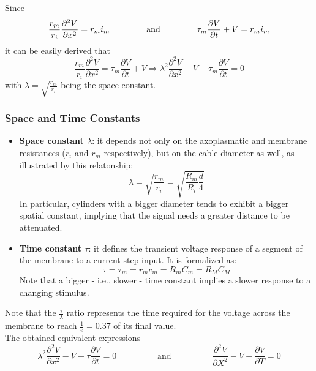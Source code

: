 Since
\begin{equation*}
    \frac{r_{m}}{r_{i}}\frac{\partial^{2}V}{\partial{x^{2}}}=r_{m}i_{m}
    \hspace{1.5cm}
    \text{and}
    \hspace{1.5cm}
    \tau_{m}\frac{\partial{V}}{\partial{t}}+V=r_{m}i_{m}
\end{equation*}
it can be easily derived that
\begin{equation*}
    \frac{r_{m}}{r_{i}}\frac{\partial^{2}V}{\partial{x^{2}}}
    =
    \tau_{m}\frac{\partial{V}}{\partial{t}}+V
    \Rightarrow
    \lambda^{2}\frac{\partial^{2}V}{\partial{x^{2}}}-V-\tau_{m}\frac{\partial{V}}{\partial{t}}
    =
    0
\end{equation*}
with \(\lambda=\sqrt{\frac{r_{m}}{r_{i}}}\) being the space constant.
\subsubsection{Space and Time Constants}
\begin{itemize}
    \item \textbf{Space constant \(\lambda\)}: it depends not only on the axoplasmatic
          and membrane resistances (\(r_{i}\) and \(r_{m}\) respectively), but on the cable
          diameter as well, as illustrated by this relatonship:
          \begin{equation*}
              \lambda=\sqrt{\frac{r_{m}}{r_{i}}}=\sqrt{\frac{R_{m}}{R_{i}}\frac{d}{4}}
          \end{equation*}
          In particular, cylinders with a bigger diameter tends to exhibit a bigger
          spatial constant, implying that the signal needs a greater distance to be attenuated.
    \item \textbf{Time constant \(\tau\)}: it defines the transient voltage response
          of a segment of the membrane to a current step input. It is formalized as:
          \begin{equation*}
              \tau=\tau_{m}=r_{m}c_{m}=R_{m}C_{m}=R_{M}C_{M}
          \end{equation*}
          Note that a bigger - i.e., slower - time constant implies a slower response to a
          changing stimulus.
\end{itemize}
Note that the \(\frac{\tau}{\lambda}\) ratio represents the time required for the voltage
across the membrane to reach \(\frac{1}{e}=0.37\) of its final value.\\
The obtained equivalent expressions
\begin{equation*}
    \lambda^{2}\frac{\partial^{2}{V}}{\partial{x^{2}}}-V-\tau\frac{\partial{V}}{\partial{t}}=0
    \hspace{2cm}
    \text{and}
    \hspace{2cm}
    \frac{\partial^{2}{V}}{\partial{X^{2}}}-V-\frac{\partial{V}}{\partial{T}}=0
\end{equation*}
